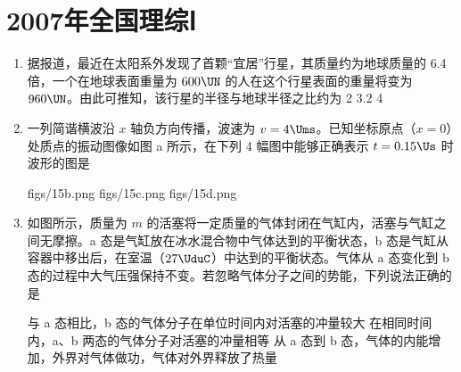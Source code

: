 \documentclass[\gkver]{gaokaozhenti}
\begin{document}
\chapter{2007年全国理综Ⅰ}

\begin{enumerate}
\item
据报道，最近在太阳系外发现了首颗“宜居”行星，其质量约为地球质量的 6.4 倍，一个在地球表面重量为 $600\UN$ 的人在这个行星表面的重量将变为 $960\UN$。由此可推知，该行星的半径与地球半径之比约为
{2}
{3.2}
{4}

\item
一列简谐横波沿 $x$ 轴负方向传播，波速为 $v=4\Ums$。已知坐标原点（$x=0$）处质点的振动图像如图 a 所示，在下列 4 幅图中能够正确表示 $t=0.15\Us$ 时波形的图是


{figs/15b.png}
{figs/15c.png}
{figs/15d.png}

\item
如图所示，质量为 $m$ 的活塞将一定质量的气体封闭在气缸内，活塞与气缸之间无摩擦。a 态是气缸放在冰水混合物中气体达到的平衡状态，b 态是气缸从容器中移出后，在室温（$27\UduC$）中达到的平衡状态。气体从 a 态变化到 b 态的过程中大气压强保持不变。若忽略气体分子之间的势能，下列说法正确的是


{与 a 态相比，b 态的气体分子在单位时间内对活塞的冲量较大}
{在相同时间内，a、b 两态的气体分子对活塞的冲量相等}
{从 a 态到 b 态，气体的内能增加，外界对气体做功，气体对外界释放了热量}


\end{enumerate}
\end{document}
